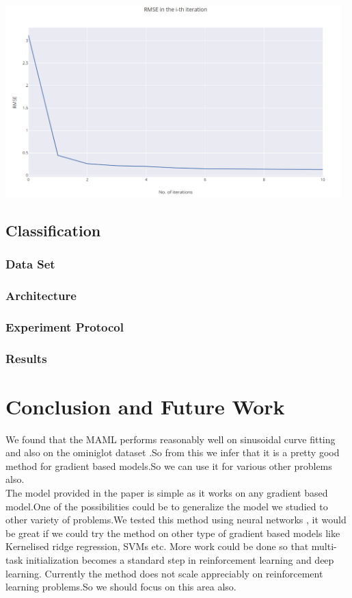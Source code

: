 \documentclass[a4paper]{article}
\begin{document}
\begin{center}
\includegraphics[width=13cm]{capture.png}
\end{center}

\subsection{Classification}
\subsubsection{Data Set}
\subsubsection{Architecture}
\subsubsection{Experiment Protocol}
\subsubsection{Results}

\section{Conclusion and Future Work}

We found that the MAML performs reasonably well on sinusoidal curve fitting and also on the ominiglot dataset .So from this we infer that it is a pretty good method for gradient based models.So we can use it for various other problems also.\\
The model provided in the paper is simple as it works on any gradient based model.One of the possibilities could be to generalize the model we studied  to other variety of problems.We tested this method using neural networks , it would be great if we could try the method on other type of gradient based models like Kernelised ridge regression, SVMs etc. More work could be done so that multi-task initialization becomes a standard step in reinforcement learning and deep learning.
Currently the method does not scale appreciably on reinforcement learning problems.So we should focus on this area also.
\end{document}
